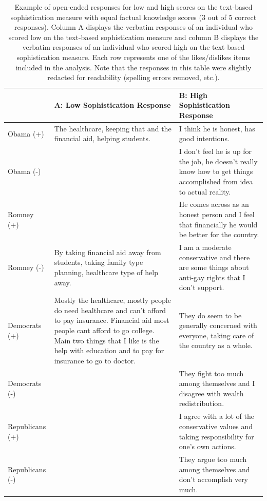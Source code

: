 \documentclass[12pt]{article}
\begin{document}
\begin{table}[ht]\footnotesize\centering
\begin{tabular}{l|p{6.5cm}|p{6.5cm}}
   \toprule
  & A: Low Sophistication Response & B: High Sophistication Response \\ 
   \midrule
   Obama (+) & The healthcare, keeping that and the financial aid, helping students. & I think he is honest, has good intentions. \\ \hdashline
     Obama (-) &  & I don't feel he is up for the job, he doesn't really know how to get things accomplished from idea to actual reality. \\ \hdashline
     Romney (+) &  & He comes across as an honest person and I feel that financially he would be better for the country. \\ \hdashline
     Romney (-) & By taking financial aid away from students, taking family type planning, healthcare type of help away. & I am a moderate conservative and there are some things about anti-gay rights that I don't support. \\ \hdashline
     Democrats (+) & Mostly the healthcare, mostly people do need healthcare and can't afford to pay insurance. Financial aid most people cant afford to go college. Main two things that I like is the help with education and to pay for insurance to go to doctor. & They do seem to be generally concerned with everyone, taking care of the country as a whole. \\ \hdashline
     Democrats (-) &  & They fight too much among themselves and I disagree with wealth redistribution. \\ \hdashline
     Republicans (+) &  & I agree with a lot of the conservative values and taking responsibility for one's own actions. \\ \hdashline
     Republicans (-) &  & They argue too much among themselves and don't accomplish very much. \\ 
    \bottomrule
 \end{tabular}
\caption{Example of open-ended responses for low and high scores on the text-based sophistication measure with equal factual knowledge scores (3 out of 5 correct responses). Column A displays the verbatim responses of an individual who scored low on the text-based sophistication measure and column B displays the verbatim responses of an individual who scored high on the text-based sophistication measure. Each row represents one of the likes/dislikes items included in the analysis. Note that the responses in this table were slightly redacted for readability (spelling errors removed, etc.).}\label{tab:ex1}
\end{table}
\end{document}
